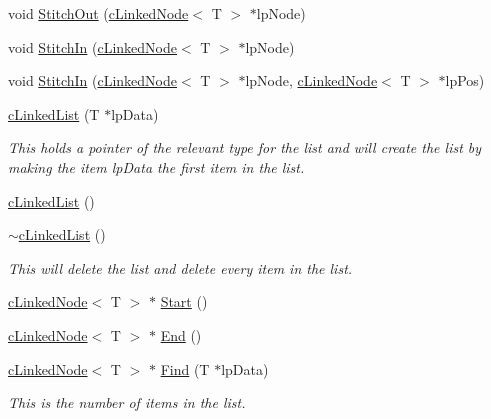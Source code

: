 \begin{DoxyCompactItemize}
\item 
void \hyperlink{classc_linked_list_a57cda13916eac63747ff70071907d7ca}{StitchOut} (\hyperlink{classc_linked_node}{cLinkedNode}$<$ T $>$ $\ast$lpNode)
\item 
void \hyperlink{classc_linked_list_adf5505edbd4933ccde08183c539e6655}{StitchIn} (\hyperlink{classc_linked_node}{cLinkedNode}$<$ T $>$ $\ast$lpNode)
\item 
void \hyperlink{classc_linked_list_acdd0ec24de3bc0a706e1ec8b4a2cb2ae}{StitchIn} (\hyperlink{classc_linked_node}{cLinkedNode}$<$ T $>$ $\ast$lpNode, \hyperlink{classc_linked_node}{cLinkedNode}$<$ T $>$ $\ast$lpPos)
\item 
\hyperlink{classc_linked_list_adbdde7829ddb9dc0518126d8e0164e10}{cLinkedList} (T $\ast$lpData)
\begin{DoxyCompactList}\small\item\em This holds a pointer of the relevant type for the list and will create the list by making the item lpData the first item in the list. \item\end{DoxyCompactList}\item 
\hyperlink{classc_linked_list_a2aacceb9a6498158af9598cb424977e3}{cLinkedList} ()
\item 
\hyperlink{classc_linked_list_a80aef75883bffae5da5ee7d8b9258502}{$\sim$cLinkedList} ()
\begin{DoxyCompactList}\small\item\em This will delete the list and delete every item in the list. \item\end{DoxyCompactList}\item 
\hyperlink{classc_linked_node}{cLinkedNode}$<$ T $>$ $\ast$ \hyperlink{classc_linked_list_a91593c408e5c5fc719624531f996c29c}{Start} ()
\item 
\hyperlink{classc_linked_node}{cLinkedNode}$<$ T $>$ $\ast$ \hyperlink{classc_linked_list_a95267afd7cde82576255fbde914a7e0d}{End} ()
\item 
\hyperlink{classc_linked_node}{cLinkedNode}$<$ T $>$ $\ast$ \hyperlink{classc_linked_list_a6014141bbd16b32e22b4b7deb873f1ae}{Find} (T $\ast$lpData)
\begin{DoxyCompactList}\small\item\em This is the number of items in the list. \item\end{DoxyCompactList}\item 

\end{DoxyCompactItemize}
